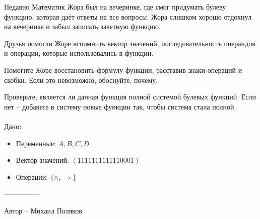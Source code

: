 \question
Недавно Математик Жора был на вечеринке, где смог придумать булеву функцию, которая даёт ответы на все вопросы. Жора слишком хорошо отдохнул на вечеринке и забыл записать заветную функцию.

Друзья помогли Жоре вспомнить вектор значений, последовательность операндов и операции, которые использовались в функции.

Помогите Жоре восстановить формулу функции, расставив знаки операций и скобки. Если это невозможно, обоснуйте, почему.

Проверьте, является ли данная функция полной системой булевых функций. Если нет -- добавьте в систему новые функции так, чтобы система стала полной.
\\
\\
Дано:
\begin{itemize}
\item Переменные: $A, B, C, D$
\item Вектор значений: $(1111111111110001)$
\item Операции: $\{\land, \rightarrow\}$
\end{itemize}

---------------

Автор -- Михаил Поляков
